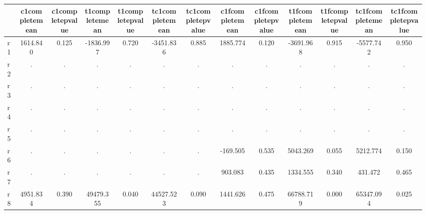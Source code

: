 \begin{table}[htbp]
\begin{tabular}{lcccccccccccc} \hline \hline
 & c1completemean  & c1completepvalue  & t1completemean  & t1completepvalue  & tc1completemean  & tc1completepvalue  & c1fcompletemean  & c1fcompletepvalue  & t1fcompletemean  & t1fcompletepvalue  & tc1fcompletemean  & tc1fcompletepvalue  \\  \hline 
r1 &  1614.840 &     0.125 & -1836.997 &     0.720 & -3451.836 &     0.885 &  1885.774 &     0.120 & -3691.968 &     0.915 & -5577.742 &     0.950 \\  
r2 &         . &         . &         . &         . &         . &         . &         . &         . &         . &         . &         . &         . \\  
r3 &         . &         . &         . &         . &         . &         . &         . &         . &         . &         . &         . &         . \\  
r4 &         . &         . &         . &         . &         . &         . &         . &         . &         . &         . &         . &         . \\  
r5 &         . &         . &         . &         . &         . &         . &         . &         . &         . &         . &         . &         . \\  
r6 &         . &         . &         . &         . &         . &         . &  -169.505 &     0.535 &  5043.269 &     0.055 &  5212.774 &     0.150 \\  
r7 &         . &         . &         . &         . &         . &         . &   903.083 &     0.435 &  1334.555 &     0.340 &   431.472 &     0.465 \\  
r8 &  4951.834 &     0.390 & 49479.355 &     0.040 & 44527.523 &     0.090 &  1441.626 &     0.475 & 66788.719 &     0.000 & 65347.094 &     0.025 \\  
\hline \hline \end{tabular}
\end{table}
